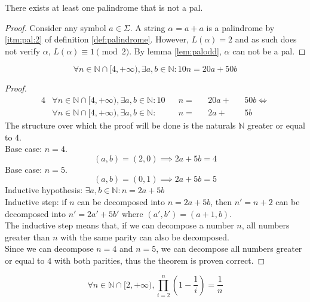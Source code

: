\documentclass[docid=TP01]{tcom_TP}
\begin{document}
\begin{theorem}
	There exists at least one palindrome that is not a pal.
\end{theorem}
\begin{proof}
	Consider any symbol $a\in\Sigma$. A string $\alpha=a+a$ is a palindrome by \eqref{itm:pal:2} of definition \ref{def:palindrome}. However, $L(\alpha)=2$ and as such does not verify $\alpha$, $L(\alpha) \equiv 1 \pmod{2}$. By lemma \eqref{lem:palodd}, $\alpha$ can not be a pal.
\end{proof}
\pagebreak
{}
\begin{theorem}
	\begin{equation*}
		\forall n \in \mathbb{N}\cap[4,+\infty),\exists a,b\in\mathbb{N}\colon 10n=20a+50b
	\end{equation*}
\end{theorem}
\begin{proof}
	\begin{alignat*}{4}
		&\forall n \in \mathbb{N}\cap[4,+\infty),\exists a,b\in\mathbb{N}\colon 10&&n=&&20a+&&50b \iff \\
		&\forall n \in \mathbb{N}\cap[4,+\infty),\exists a,b\in\mathbb{N}\colon   &&n=&&2a +&&5b
	\end{alignat*}
	The structure over which the proof will be done is the naturals $\mathbb{N}$ greater or equal to $4$.\\
	Base case: $n=4$.
	\begin{equation*}
		(a,b)=(2,0) \implies 2a+5b=4
	\end{equation*}
	Base case: $n=5$.
	\begin{equation*}
		(a,b)=(0,1) \implies 2a+5b=5
	\end{equation*}
	Inductive hypothesis: $\exists a,b\in\mathbb{N}\colon n=2a+5b$\\
	Inductive step: if $n$ can be decomposed into $n=2a+5b$, then $n'=n+2$ can be decomposed into $n'=2a'+5b'$ where $(a',b')=(a+1,b)$.\\
	The inductive step means that, if we can decompose a number $n$, all numbers greater than $n$ with the same parity can also be decomposed.\\
	Since we can decompose $n=4$ and $n=5$, we can decompose all numbers greater or equal to $4$ with both parities, thus the theorem is proven correct.
\end{proof}
\begin{theorem}
	\begin{equation*}
		\forall n \in \mathbb{N}\cap[2,+\infty),\prod_{i=2}^{n}{\left(1-\frac{1}{i}\right)}=\frac{1}{n}
	\end{equation*}
\end{theorem}
\end{document}
